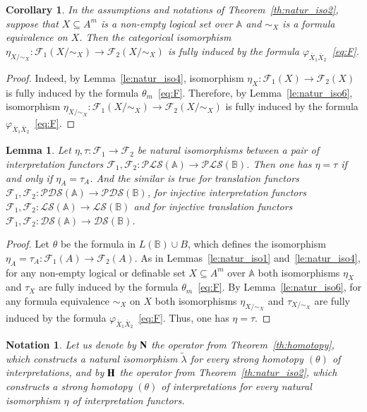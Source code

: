\documentclass[12pt]{article}
\newtheorem{lemma}{Lemma}
\newtheorem{corollary}{Corollary}
\newtheorem{notation}{Notation}
\theoremstyle{definition}
\def\MA{{\mathbb{A}}}
\def\MB{{\mathbb{B}}}
\def\F{{\mathcal{F}}}
\def\PLS{{\mathcal{PLS}}}
\def\PDS{{\mathcal{PDS}}}
\def\DS{{\mathcal{DS}}}
\def\LS{{\mathcal{LS}}}
\begin{document}
\begin{corollary}\label{le:natur_iso5}
In the assumptions and notations of Theorem~\ref{th:natur_iso2}, suppose that $X\subseteq A^m$ is a non-empty logical set over $\MA$ and $\sim_X$ is a formula equivalence on $X$. Then the categorical isomorphism $\eta_{X/{\sim_X}}\colon \F_1(X/{\sim_X})\to \F_2(X/{\sim_X})$ is fully induced by the formula $\varphi_{\bar X_1 \bar X_2}$~\eqref{eq:F}.
\end{corollary}

\begin{proof}
Indeed, by Lemma~\ref{le:natur_iso4}, isomorphism $\eta_X\colon \F_1(X)\to \F_2(X)$ is fully induced by the formula $\theta_m$~\eqref{eq:F}. Therefore, by Lemma~\ref{le:natur_iso6}, isomorphism $\eta_{X/{\sim_X}}\colon \F_1(X/{\sim_X})\to \F_2(X/{\sim_X})$ is fully induced by the formula $\varphi_{\bar X_1 \bar X_2}$~\eqref{eq:F}.
\end{proof}

\begin{lemma}\label{cor:natur_iso}
Let $\eta,\tau\colon \F_1\to \F_2$ be natural isomorphisms between a pair of interpretation functors $\F_1,\F_2\colon \PLS(\MA)\to\PLS(\MB)$. Then one has $\eta=\tau$ if and only if $\eta_A=\tau_A$. And the similar is true for translation functors $\F_1,\F_2\colon \PDS(\MA)\to\PDS(\MB)$, for injective interpretation functors $\F_1,\F_2\colon \LS(\MA)\to\LS(\MB)$ and for injective translation functors $\F_1,\F_2\colon \DS(\MA)\to\DS(\MB)$.
\end{lemma}

\begin{proof}
Let $\theta$ be the formula in $L(\MB)\cup B$, which defines the isomorphism $\eta_A=\tau_A\colon \F_1(A)\to \F_2(A)$. As in Lemmas~\ref{le:natur_iso1} and~\ref{le:natur_iso4}, for any non-empty logical or definable set $X\subseteq A^m$ over $\MA$ both isomorphisms $\eta_X$ and $\tau_X$ are fully induced by the formula $\theta_m$~\eqref{eq:F}. By Lemma~\ref{le:natur_iso6}, for any formula equivalence $\sim_X$ on $X$ both isomorphisms $\eta_{X/{\sim_X}}$ and $\tau_{X/{\sim_X}}$ are fully induced by the formula $\varphi_{\bar X_1 \bar X_2}$~\eqref{eq:F}. Thus, one has $\eta=\tau$.
\end{proof}

\begin{notation}
Let us denote by ${\bf N}$ the operator from Theorem~\ref{th:homotopy}, which constructs a natural isomorphism $\tilde\lambda$ for every strong homotopy $(\theta)$ of interpretations, and by ${\bf H}$ the operator from Theorem~\ref{th:natur_iso2}, which constructs a strong homotopy $(\theta)$ of interpretations for every natural isomorphism $\eta$ of interpretation functors. 
\end{notation}
\end{document}
